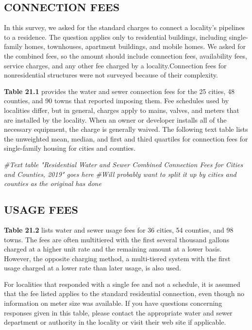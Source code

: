 \documentclass[
]{book}
\newenvironment{Shaded}{\begin{snugshade}}{\end{snugshade}}
\newcommand{\CommentTok}[1]{\textcolor[rgb]{0.56,0.35,0.01}{\textit{#1}}}
\begin{document}
\hypertarget{connection-fees}{%
\subsection{CONNECTION FEES}\label{connection-fees}}

In this survey, we asked for the standard charges to connect a locality's pipelines to a residence. The question applies only to residential buildings, including single-family homes, townhouses, apartment buildings, and mobile homes. We asked for the combined fees, so the amount should include connection fees, availability fees, service charges, and any other fee charged by a locality.Connection fees for nonresidential structures were not surveyed because of their complexity.

\textbf{Table 21.1} provides the water and sewer connection fees for the 25 cities, 48 counties, and 90 towns that reported imposing them. Fee schedules used by localities differ, but in general, charges apply to mains, valves, and meters that are installed by the locality. When an owner or developer installs all of the necessary equipment, the charge is generally waived. The following text table lists the unweighted mean, median, and first and third quartiles for connection fees for single-family housing for cities and counties.

\begin{Shaded}
\begin{Highlighting}[]
\CommentTok{\#Text table "Residential Water and Sewer Combined Connection Fees for Cities and Counties, 2019" goes here }
\CommentTok{\#Will probably want to split it up by cities and counties as the original has done}
\end{Highlighting}
\end{Shaded}

\hypertarget{usage-fees}{%
\subsection{USAGE FEES}\label{usage-fees}}

\textbf{Table 21.2} lists water and sewer usage fees for 36 cities, 54 counties, and 98 towns. The fees are often multitiered with the first several thousand gallons charged at a higher unit rate and the remaining amount at a lower basis. However, the opposite charging method, a multi-tiered system with the first usage charged at a lower rate than later usage, is also used.

For localities that responded with a single fee and not a schedule, it is assumed that the fee listed applies to the standard residential connection, even though no information on meter size was available. If you have questions concerning responses given in this table, please contact the appropriate water and sewer department or authority in the locality or visit their web site if applicable.
\end{document}
